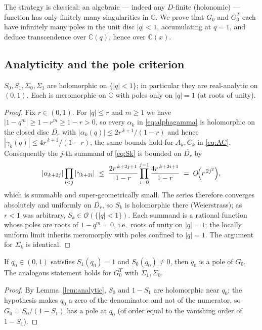 The strategy is classical: an algebraic --- indeed any $D$-finite (holonomic)
--- function has only finitely many singularities in $\mathbb C$. We prove that
$G_0$ and $G^{T}_0$ each have infinitely many poles in the unit disc
$|q|<1$, accumulating at $q=1$, and deduce transcendence over $\mathbb C(q)$,
hence over $\mathbb C(x)$.

\subsection{Analyticity and the pole criterion}

\begin{lemma}\label{lem:analytic}
$S_0,S_1,\Sigma_0,\Sigma_1$ are holomorphic on $\{|q|<1\}$; in particular they
are real-analytic on $(0,1)$. Each is meromorphic on $\mathbb C$ with poles only
on $|q|=1$ \textup(at roots of unity\textup).
\end{lemma}

\begin{proof}
Fix $r\in(0,1)$. For $|q|\le r$ and $m\ge1$ we have $|1-q^{m}|\ge 1-r^{m}\ge
1-r>0$, so every $\alpha_k$ in \eqref{eq:alphagamma} is holomorphic on the closed
disc $\overline{D_r}$ with $|\alpha_k(q)|\le 2r^{\,k+1}/(1-r)$ and hence
$|\gamma_k(q)|\le 4r^{\,k+1}/(1-r)$; the same bounds hold for $A_k,C_k$ in
\eqref{eq:AC}. Consequently the $j$-th summand of \eqref{eq:Sk} is bounded on
$\overline{D_r}$ by
\[
  |\alpha_{k+2j}|\prod_{i<j}|\gamma_{k+2i}|
  \;\le\;\frac{2r^{\,k+2j+1}}{1-r}\prod_{i=0}^{j-1}\frac{4r^{\,k+2i+1}}{1-r}
  \;=\;O\!\Bigl(r^{\,2j^{2}}\Bigr),
\]
which is summable and super-geometrically small. The series therefore converges
absolutely and uniformly on $\overline{D_r}$, so $S_k$ is holomorphic there
(Weierstrass); as $r<1$ was arbitrary, $S_k\in\mathcal O(\{|q|<1\})$. Each
summand is a rational function whose poles are roots of $1-q^{m}=0$, i.e.\ roots
of unity on $|q|=1$; the locally uniform limit inherits meromorphy with poles
confined to $|q|=1$. The argument for $\Sigma_k$ is identical.
\end{proof}

\begin{corollary}\label{cor:polecrit}
If $q_0\in(0,1)$ satisfies $S_1(q_0)=1$ and $S_0(q_0)\ne0$, then $q_0$ is a pole
of $G_0$. The analogous statement holds for $G^{T}_0$ with $\Sigma_1,\Sigma_0$.
\end{corollary}

\begin{proof}
By Lemma~\ref{lem:analytic}, $S_0$ and $1-S_1$ are holomorphic near $q_0$; the
hypothesis makes $q_0$ a zero of the denominator and not of the numerator, so
$G_0=S_0/(1-S_1)$ has a pole at $q_0$ (of order equal to the vanishing order of
$1-S_1$). \end{proof}

